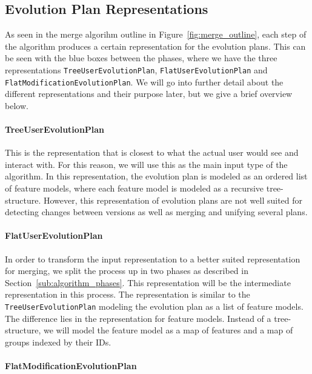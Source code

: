\documentclass[a4paper,english]{ifimaster}
\begin{document}
\subsection{Evolution Plan Representations}%
\label{sub:evolution_plan_representations}

As seen in the merge algorihm outline in Figure~\ref{fig:merge_outline}, each step of the algorithm produces a certain representation for the evolution plans. This can be seen with the blue boxes between the phases, where we have the three representations \texttt{Tree\-User\-Evolution\-Plan}, \texttt{Flat\-User\-Evolution\-Plan} and \texttt{Flat\-Modification\-Evolution\-Plan}. We will go into further detail about the different representations and their purpose later, but we give a brief overview below.

\paragraph{TreeUserEvolutionPlan}%
\label{par:treeuserevolutionplan}

This is the representation that is closest to what the actual user would see and interact with. For this reason, we will use this as the main input type of the algorithm. In this representation, the evolution plan is modeled as an ordered list of feature models, where each feature model is modeled as a recursive tree-structure. However, this representation of evolution plans are not well suited for detecting changes between versions as well as merging and unifying several plans.

\paragraph{FlatUserEvolutionPlan}%
\label{par:flatuserevolutionplan}

In order to transform the input representation to a better suited representation for merging, we split the process up in two phases as described in Section~\vref{sub:algorithm_phases}. This representation will be the intermediate representation in this process. The representation is similar to the \texttt{Tree\-User\-Evolution\-Plan} modeling the evolution plan as a list of feature models. The difference lies in the representation for feature models. Instead of a tree-structure, we will model the feature model as a map of features and a map of groups indexed by their IDs.

\paragraph{FlatModificationEvolutionPlan}%
\label{par:flatmodificationevolutionplan}
\end{document}
